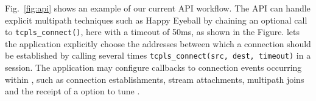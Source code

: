 Fig.~\ref{fig:api} shows an example of our current API workflow. The API can
handle explicit multipath techniques such as Happy Eyeball by chaining an
optional call to \texttt{tcpls\_connect()}, here with a timeout of 50ms, as
shown in the Figure. \tcpls lets the application explicitly choose the addresses
between which a \tcp connection should be established by calling several times
\texttt{tcpls\_connect(src, dest, timeout)} in a \tcpls session. The
application may configure
callbacks to connection events occurring within \tcpls, such as connection
establishments, stream attachments, multipath joins and the receipt of a \tcp
option to tune \tcp.







